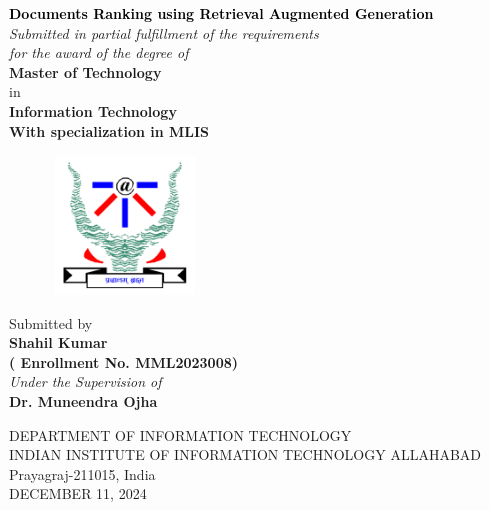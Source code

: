 \newpage
\thispagestyle{empty}
\graphicspath{{Figures/PNG/}{Figures/}}
\begin{center}
	\vspace{8mm}
	\huge \textcolor{black}{\textbf{Documents Ranking using Retrieval Augmented Generation 
	}} \\
	\vspace{10mm}
	\large \textit{Submitted in partial fulfillment of the requirements \\ for the award of the degree of} \\
	\vspace{10mm}
	\Large {\textbf{Master of Technology}} \\
        \large in \\
        \Large {\textbf{Information Technology}} \\
	\Large {\textbf{With specialization in MLIS}} \\
    \begin{figure}[h!]
		\centering
		\includegraphics[height=3.7cm,width=4cm]{IMAGE/IIITAlogo.png}
	\end{figure}
    \vspace{10mm}
    \large Submitted by \\
    \vspace{6mm}
	\textbf{{\Large Shahil Kumar} \\ {\large ( Enrollment No. MML2023008)}} \\
	\vspace{6mm}
	\emph{Under the Supervision of }\\
    \textbf{Dr. Muneendra Ojha}  \\
    \vspace{4mm}
	\par\vspace{1mm}
 \vspace{15mm}
	\large {DEPARTMENT OF INFORMATION TECHNOLOGY\\
	INDIAN INSTITUTE OF INFORMATION TECHNOLOGY ALLAHABAD\\
			Prayagraj-211015, India\\
    \vspace{5mm}
    DECEMBER 11, 2024}
\end{center}
